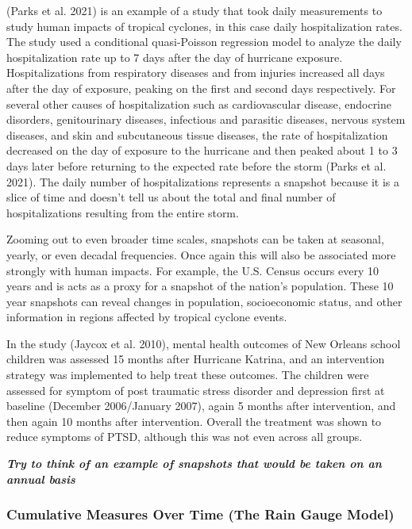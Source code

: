 \documentclass[
]{article}
\begin{document}
(Parks et al. 2021) is an example of a study that took daily
measurements to study human impacts of tropical cyclones, in this case
daily hospitalization rates. The study used a conditional quasi-Poisson
regression model to analyze the daily hospitalization rate up to 7 days
after the day of hurricane exposure. Hospitalizations from respiratory
diseases and from injuries increased all days after the day of exposure,
peaking on the first and second days respectively. For several other
causes of hospitalization such as cardiovascular disease, endocrine
disorders, genitourinary diseases, infectious and parasitic diseases,
nervous system diseases, and skin and subcutaneous tissue diseases, the
rate of hospitalization decreased on the day of exposure to the
hurricane and then peaked about 1 to 3 days later before returning to
the expected rate before the storm (Parks et al. 2021). The daily number
of hospitalizations represents a snapshot because it is a slice of time
and doesn't tell us about the total and final number of hospitalizations
resulting from the entire storm.

Zooming out to even broader time scales, snapshots can be taken at
seasonal, yearly, or even decadal frequencies. Once again this will also
be associated more strongly with human impacts. For example, the U.S.
Census occurs every 10 years and is acts as a proxy for a snapshot of
the nation's population. These 10 year snapshots can reveal changes in
population, socioeconomic status, and other information in regions
affected by tropical cyclone events.

In the study (Jaycox et al. 2010), mental health outcomes of New Orleans
school children was assessed 15 months after Hurricane Katrina, and an
intervention strategy was implemented to help treat these outcomes. The
children were assessed for symptom of post traumatic stress disorder and
depression first at baseline (December 2006/January 2007), again 5
months after intervention, and then again 10 months after intervention.
Overall the treatment was shown to reduce symptoms of PTSD, although
this was not even across all groups.

\textbf{\emph{Try to think of an example of snapshots that would be
taken on an annual basis}}

\hypertarget{cumulative-measures-over-time-the-rain-gauge-model}{%
\subsubsection{Cumulative Measures Over Time (The Rain Gauge
Model)}\label{cumulative-measures-over-time-the-rain-gauge-model}}
\end{document}

